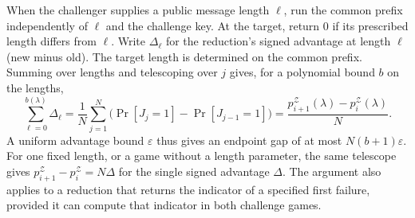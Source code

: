 When the challenger supplies a public message length $\ell$, run the
common prefix independently of $\ell$ and the challenge key.  At the
target, return $0$ if its prescribed length differs from $\ell$.
Write $\Delta_\ell$ for the reduction's signed advantage at length
$\ell$ (new minus old).  The target length is determined on the common prefix.  Summing over
lengths and telescoping over $j$
gives, for a polynomial bound $b$ on the lengths,
\begin{equation}
 \sum_{\ell=0}^{b(\lambda)}\Delta_\ell
   =\frac{1}{N}\sum_{j=1}^N
       \bigl(\Pr[J_j=1]-\Pr[J_{j-1}=1]\bigr)
   =\frac{p_{i+1}^{\mathcal Z}(\lambda)-p_i^{\mathcal Z}(\lambda)}{N}.
 \label{eq:instance-sweep}
\end{equation}
A uniform advantage bound $\varepsilon$ thus gives an endpoint gap of
at most $N(b+1)\varepsilon$.  For one fixed length, or a game without a
length parameter, the same telescope gives $p_{i+1}^{\mathcal Z}-p_i^{\mathcal Z}
=N\Delta$ for the single signed advantage $\Delta$.  The argument also
applies to a reduction that returns the indicator of a specified first
failure, provided it can compute that indicator in both challenge games.

